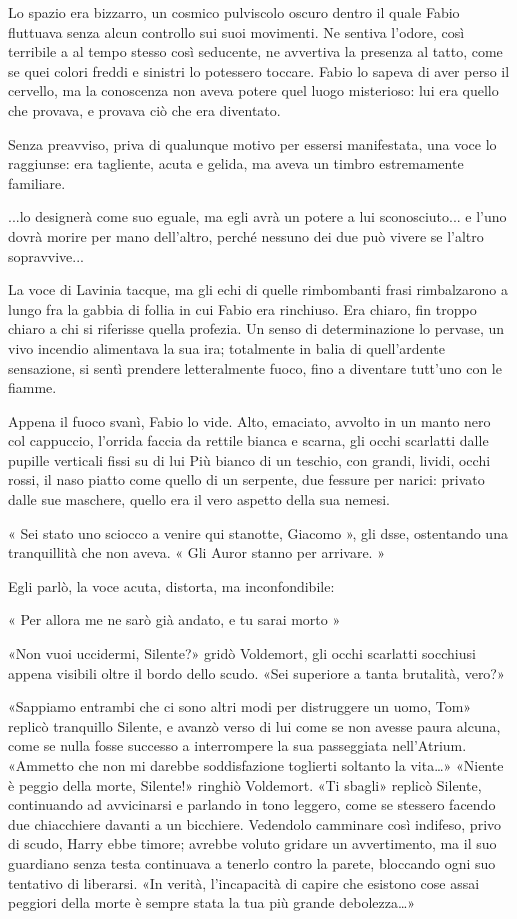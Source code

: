 
Lo spazio era bizzarro, un cosmico pulviscolo oscuro dentro il quale Fabio fluttuava senza alcun controllo sui suoi movimenti. Ne sentiva l'odore, così terribile a al tempo stesso così seducente, ne avvertiva la presenza al tatto, come se quei colori freddi e sinistri lo potessero toccare. Fabio lo sapeva di aver perso il cervello, ma la conoscenza non aveva potere quel luogo misterioso: lui era quello che provava, e provava ciò che era diventato.

Senza preavviso, priva di qualunque motivo per essersi manifestata, una voce lo raggiunse: era tagliente, acuta e gelida, ma aveva un timbro estremamente familiare.

...lo designerà come suo eguale, ma egli avrà un potere a lui sconosciuto...
e l'uno dovrà morire per mano dell'altro, perché nessuno dei due può vivere se l'altro sopravvive...

La voce di Lavinia tacque, ma gli echi di quelle rimbombanti frasi rimbalzarono a lungo fra la gabbia di follia in cui Fabio era rinchiuso. Era chiaro, fin troppo chiaro a chi si riferisse quella profezia. Un senso di determinazione lo pervase, un vivo incendio alimentava la sua ira; totalmente in balia di quell'ardente sensazione, si sentì prendere letteralmente fuoco, fino a diventare tutt'uno con le fiamme.

Appena il fuoco svanì, Fabio lo vide. Alto, emaciato, avvolto in un manto nero col cappuccio, l’orrida faccia da rettile bianca e scarna, gli occhi scarlatti dalle pupille verticali fissi su di lui Più bianco di un teschio, con grandi, lividi, occhi rossi, il naso piatto come quello di un serpente, due fessure per narici: privato dalle sue maschere, quello era il vero aspetto della sua nemesi.

« Sei stato uno sciocco a venire qui stanotte, Giacomo », gli dsse, ostentando una tranquillità che non aveva. « Gli Auror stanno per arrivare. »

Egli parlò, la voce acuta, distorta, ma inconfondibile:

« Per allora me ne sarò già andato, e tu sarai morto »

«Non vuoi uccidermi, Silente?» gridò Voldemort, gli occhi scarlatti socchiusi appena visibili oltre il bordo dello scudo. «Sei superiore a tanta brutalità, vero?»

«Sappiamo entrambi che ci sono altri modi per distruggere un uomo, Tom» replicò tranquillo Silente, e avanzò verso di lui come se non avesse paura alcuna, come se nulla fosse successo a interrompere la sua passeggiata nell’Atrium. «Ammetto che non mi darebbe soddisfazione toglierti soltanto la vita…»
«Niente è peggio della morte, Silente!» ringhiò Voldemort.
«Ti sbagli» replicò Silente, continuando ad avvicinarsi e parlando in tono leggero, come se stessero facendo due chiacchiere davanti a un bicchiere. Vedendolo camminare così indifeso, privo di scudo, Harry ebbe timore; avrebbe voluto gridare un avvertimento, ma il suo guardiano senza testa continuava a tenerlo contro la parete, bloccando ogni suo tentativo di liberarsi. «In verità, l’incapacità di capire che esistono cose assai peggiori della morte è sempre stata la tua più grande debolezza…»


